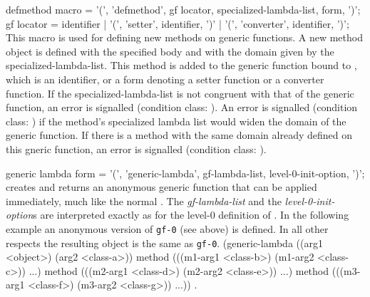 \begin{optDefinition}
\Syntax
\savesyntax{}\vbox{\syntax
defmethod macro
   = '(', 'defmethod', gf locator,
     specialized-lambda-list,
     {form}, ')';
gf locator
   = identifier
   | '(', 'setter', identifier, ')'
   | '(', 'converter', identifier, ')';
\endsyntax}
%
\remarks%
This macro is used for defining new methods on generic functions.  A new method
object is defined with the specified body and with the domain given by the
specialized-lambda-list.  This method is added to the generic function bound to
, which is an identifier, or a form denoting a setter function or
a converter function. If the specialized-lambda-list is not congruent with that
of the generic function, an error is signalled (condition class:
).  An error is signalled (condition
class: 
) if the method's specialized lambda
list would widen the domain of the generic function.  If there is a method with
the same domain already defined on this gneric function, an error is signalled
(condition class:
).

\Syntax
\savesyntax\genericLambdaSyntax\vbox{\syntax
generic lambda form
   = '(', 'generic-lambda', gf-lambda-list,
     {level-0-init-option}, ')';
\endsyntax}
%
\remarks%
 creates and returns an anonymous generic function that
can be applied immediately, much like the normal .  The {\em
    gf-lambda-list} and the {\em level-0-init-option\/}s are interpreted exactly
as for the level-0 definition of .  \examples In the
following example an anonymous version of {\tt gf-0} (see
 above) is defined.  In all other respects the resulting
object is the same as {\tt gf-0}.
%
{\syntax
(generic-lambda ((arg1 <object>) (arg2 <class-a>))
  method (((m1-arg1 <class-b>) (m1-arg2 <class-c>)) ...)
  method (((m2-arg1 <class-d>) (m2-arg2 <class-e>)) ...)
  method (((m3-arg1 <class-f>) (m3-arg2 <class-g>)) ...))
\endsyntax}
%
\seealso%
.
%
\end{optDefinition}

